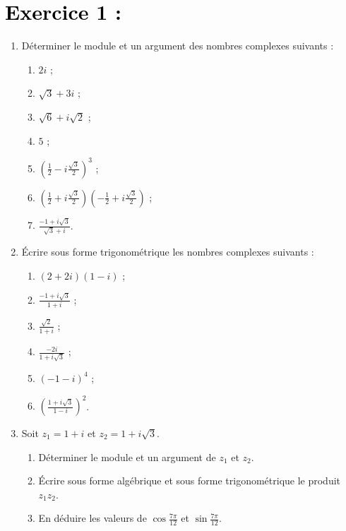 \documentclass[12pt]{article}
\begin{document}
\section*{\textcolor{black}{Exercice 1 :}}
\begin{enumerate}
    \item Déterminer le module et un argument des nombres complexes suivants :
    \begin{enumerate}
        \item $2i$ ;
        \item $\sqrt{3} + 3i$ ;
        \item $\sqrt{6} + i\sqrt{2}$ ;
        \item $5$ ;
        \item $\left(\frac{1}{2}-i\frac{\sqrt{3}}{2}\right)^3$ ;
        \item $\left(\frac{1}{2}+i\frac{\sqrt{3}}{2}\right)\left(-\frac{1}{2}+i\frac{\sqrt{3}}{2}\right)$ ;
        \item $\frac{-1+i\sqrt{3}}{\sqrt{3} + i}$.
    \end{enumerate}
    \item Écrire sous forme trigonométrique les nombres complexes suivants :
    \begin{enumerate}
        \item $(2+2i)(1-i)$ ;
        \item $\frac{-1+i\sqrt{3}}{1+i}$ ;
        \item $\frac{\sqrt{2}}{1+i}$ ;
        \item $\frac{-2i}{1+i\sqrt{3}}$ ;
        \item $(-1-i)^4$ ;
        \item $\left(\frac{1+i\sqrt{3}}{1-i}\right)^2$.
    \end{enumerate}
    \item Soit $z_1 = 1+i$ et $z_2 = 1+i\sqrt{3}$.
    \begin{enumerate}
        \item Déterminer le module et un argument de $z_1$ et $z_2$.
        \item Écrire sous forme algébrique et sous forme trigonométrique le produit $z_1z_2$.
        \item En déduire les valeurs de $\cos\frac{7\pi}{12}$ et $\sin\frac{7\pi}{12}$.
    \end{enumerate}
\end{enumerate}
\end{document}
